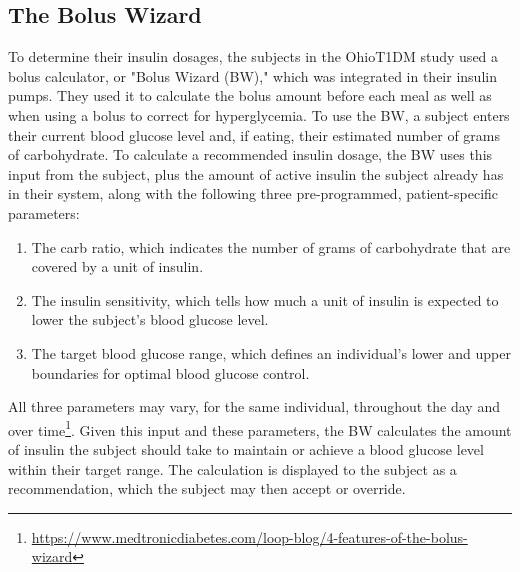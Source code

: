 \documentclass[journal,article,submit,moreauthors,pdftex]{Definitions/mdpi}
\begin{document}
\subsection{The Bolus Wizard}
\label{sec:bw}

To determine their insulin dosages, the subjects in the OhioT1DM study used a bolus calculator, or "Bolus Wizard (BW)," which was integrated in their insulin pumps.  They used it to calculate the bolus amount before each meal as well as when using a bolus to correct for hyperglycemia.  To use the BW, a subject enters their current blood glucose level and, if eating, their estimated number of grams of carbohydrate.  To calculate a recommended insulin dosage, the BW uses this input from the subject, plus the amount of active insulin the subject already has in their system, along with the following three pre-programmed, patient-specific parameters:
\begin{enumerate}
    \item The carb ratio, which indicates the number of grams of carbohydrate that are covered by a unit of insulin.
    \item The insulin sensitivity, which tells how much a unit of insulin is expected to lower the subject's blood glucose level.
    \item The target blood glucose range, which defines an individual's lower and upper boundaries for optimal blood glucose control.
\end{enumerate}
All three parameters may vary, for the same individual, throughout the day and over time\footnote{\url{https://www.medtronicdiabetes.com/loop-blog/4-features-of-the-bolus-wizard}}. Given this input and these parameters, the BW calculates the amount of insulin the subject should take to maintain or achieve a blood glucose level within their target range. The calculation is displayed to the subject as a recommendation, which the subject may then accept or override.
\end{document}
